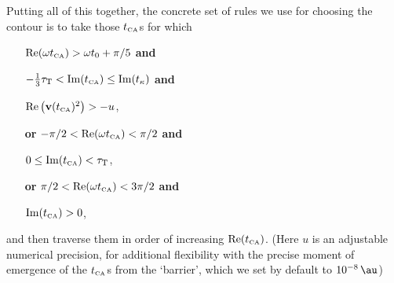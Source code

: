 Putting all of this together, the concrete set of rules we use for choosing the contour is to take those ${t_{\scriptscriptstyle\mathrm{CA}}}$s for which
\begin{enumerate}[itemsep=-0.8mm]
\item[] $\Re(\omega {t_{\scriptscriptstyle\mathrm{CA}}})>\omega{t_0} +\pi/5$ \textbf{and}
\item[] $-\frac13 {\tau_\mathrm{T}}<\Im({t_{\scriptscriptstyle\mathrm{CA}}})\leq \Im({t_\kappa})$ \textbf{and}
\item[] $\Re\left(\vb{v}({t_{\scriptscriptstyle\mathrm{CA}}})^2\right) > -u$,
\item[\textbf{or}\hspace{3pt}] $-\pi/2 < \Re(\omega{t_{\scriptscriptstyle\mathrm{CA}}}) < \pi/2$ \textbf{and}
\item[] $0\leq\Im({t_{\scriptscriptstyle\mathrm{CA}}})<{\tau_\mathrm{T}}$,
\item[\textbf{or}\hspace{3pt}] $\pi/2 < \Re(\omega{t_{\scriptscriptstyle\mathrm{CA}}}) < 3\pi/2$ \textbf{and}
\item[] $\Im({t_{\scriptscriptstyle\mathrm{CA}}})>0$,
\end{enumerate}
and then traverse them in order of increasing $\Re({t_{\scriptscriptstyle\mathrm{CA}}})$. (Here $u$ is an adjustable numerical precision, for additional flexibility with the precise moment of emergence of the ${t_{\scriptscriptstyle\mathrm{CA}}}$s from the `barrier', which we set by default to $\SI{e-8}{\au}$)




